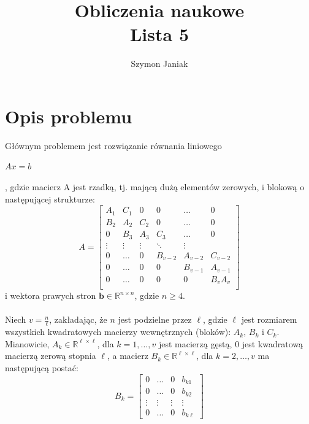 \documentclass{article}
\title{%
	Obliczenia naukowe \\
	\large Lista 5}
\author{Szymon Janiak}
\begin{document}
\maketitle

\section*{Opis problemu}
	Głównym problemem jest rozwiązanie równania liniowego\\
	\centerline{$Ax = b$},
	gdzie macierz A jest rzadką, tj. mającą dużą elementów zerowych, i blokową o następującej strukturze:\\
	\[
	A = \begin{bmatrix}
	A_1 & C_1 & 0 & 0 & \dots & 0 \\
	B_2 & A_2 & C_2 & 0 & \dots & 0 \\
	0 & B_3 & A_3 & C_3 & \dots & 0 \\
	\vdots & \vdots & \vdots & \ddots & \vdots \\
	0 & \dots & 0 & B_{v-2} & A_{v-2} & C_{v-2} \\
	0 & \dots & 0 & 0 & B_{v-1} & A_{v-1} \\
	0 & \dots & 0 & 0 & 0 & B_v A_v \\
	\end{bmatrix}
	\]
	i wektora prawych stron $\mathbf{b} \in \mathbb{R}^{n \times n}$, gdzie $n \geq 4$.\\
	\\
	Niech $v = \frac{n}{\ell}$, zakładając, że $n$ jest podzielne przez $\ell$, gdzie $\ell$ jest rozmiarem wszystkich kwadratowych macierzy wewnętrznych (bloków): $A_k$, $B_k$ i $C_k$. Mianowicie, $A_k \in \mathbb{R}^{\ell \times \ell}$, dla $k = 1, \ldots, v$ jest macierzą gęstą, $0$ jest kwadratową macierzą zerową stopnia $\ell$, a macierz $B_k \in \mathbb{R}^{\ell \times \ell}$, dla $k = 2, \ldots, v$ ma następującą postać:\\
	\[
	B_k = \begin{bmatrix}
	    0 & \dots & 0 & b_{k1} \\
	    0 & \dots & 0 & b_{k2} \\
	    \vdots & \vdots & \vdots & \vdots \\
	    0 & \dots & 0 & b_{k\ell}
	\end{bmatrix}
	\]\\
\end{document}
